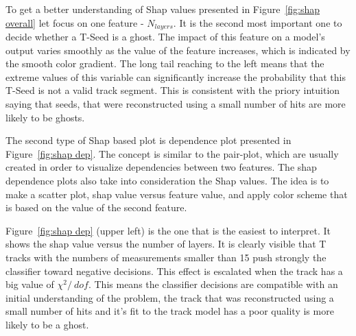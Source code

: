To get a better understanding of Shap values presented in Figure~\ref{fig:shap overall} let focus on one feature - $N_{layers}$. It is the second most important one to decide whether a T-Seed is a ghost. The impact of this feature on a model's output varies smoothly as the value of the feature increases, which is indicated by the smooth color gradient. The long tail reaching to the left means that the extreme values of this variable can significantly increase the probability that this T-Seed is not a valid track segment. This is consistent with the priory intuition saying that seeds, that were reconstructed using a small number of hits are more likely to be ghosts. 

The second type of Shap based plot is dependence plot presented in Figure~\ref{fig:shap dep}. The concept is similar to the pair-plot, which are usually created in order to visualize dependencies between two features. The shap dependence plots also take into consideration the Shap values. The idea is to make a scatter plot, shap value versus feature value, and apply color scheme that is based on the value of the second feature.

 Figure~\ref{fig:shap dep} (upper left) is the one that is the easiest to interpret. It shows the shap value versus the number of layers. It is clearly visible that T tracks with the numbers of measurements smaller than 15 push strongly the classifier toward negative decisions. This effect is escalated when the track has a big value of $\chi^2 /\ dof $. This means the classifier decisions are compatible with an initial understanding of the problem, the track that was reconstructed using a small number of hits and it's fit to the track model has a poor quality is more likely to be a ghost. 


